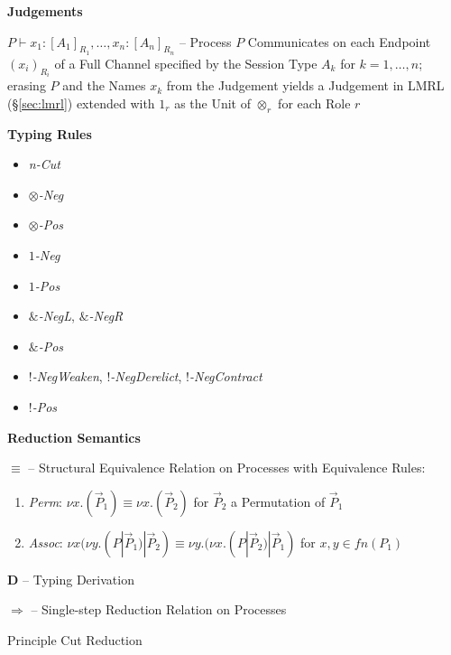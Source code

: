 \textbf{Judgements}

$P \vdash x_1:[A_1]_{R_1}, \ldots, x_n:[A_n]_{R_n}$ -- Process $P$
Communicates on each Endpoint $(x_i)_{R_i}$ of a Full Channel
specified by the Session Type $A_k$ for $k = 1,\ldots,n$; erasing $P$
and the Names $x_k$ from the Judgement yields a Judgement in LMRL
(\S\ref{sec:lmrl}) extended with $1_r$ as the Unit of $\otimes_r$ for
each Role $r$


\textbf{Typing Rules}

\begin{itemize}
  \item \emph{n-Cut}
  \item \emph{$\otimes$-Neg}
  \item \emph{$\otimes$-Pos}
  \item \emph{$1$-Neg}
  \item \emph{$1$-Pos}
  \item \emph{$\&$-NegL}, \emph{$\&$-NegR}
  \item \emph{$\&$-Pos}
  \item \emph{$!$-NegWeaken}, \emph{$!$-NegDerelict},
    \emph{$!$-NegContract}
  \item \emph{$!$-Pos}
\end{itemize}


\textbf{Reduction Semantics}

$\equiv$ -- Structural Equivalence Relation on Processes with
Equivalence Rules:
\begin{enumerate}
  \item \emph{Perm}: $\nu x.(\vec{P}_1) \equiv \nu x.(\vec{P}_2)$ for
    $\vec{P}_2$ a Permutation of $\vec{P}_1$
  \item \emph{Assoc}: $\nu x(\nu y.(P|\vec{P}_1)|\vec{P}_2) \equiv \nu
    y.(\nu x.(P|\vec{P}_2)|\vec{P}_1)$ for $x,y \in fn(P_1)$
\end{enumerate}

$\mathbf{D}$ -- Typing Derivation

$\Rightarrow$ -- Single-step Reduction Relation on Processes

Principle Cut Reduction %

